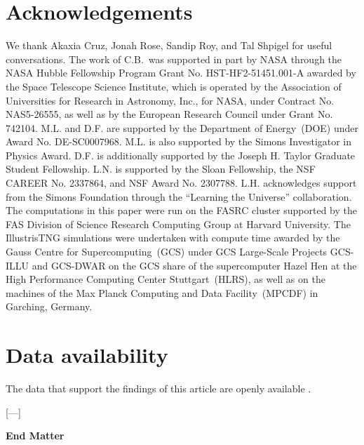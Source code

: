 \documentclass[aps,prl,reprint,superscriptaddress,nopreprintnumbers,nobibnotes,floatfix,longbibliography,footinbib]{revtex4-2}
\let\oldtheequation\theequation
\renewcommand\theequation{(\oldtheequation)}
\newcommand{\Illustris}{Illustris}
\newcommand{\TNG}{TNG}
\begin{document}
\section{Acknowledgements}
We thank Akaxia Cruz, Jonah Rose, Sandip Roy, and Tal Shpigel for useful conversations. The work of C.B.~was supported in part by NASA through the NASA Hubble Fellowship Program Grant No. HST-HF2-51451.001-A awarded by the Space Telescope Science Institute, which is operated by the Association of Universities for Research in Astronomy, Inc., for NASA, under Contract No. NAS5-26555, as well as by the European Research Council under Grant No. 742104. M.L. and D.F. are supported by the Department of Energy~(DOE) under Award No. DE-SC0007968. M.L. is also supported by the Simons Investigator in Physics Award. D.F. is additionally supported by the Joseph H. Taylor Graduate Student Fellowship. L.N. is supported by the Sloan Fellowship, the NSF CAREER No. 2337864, and NSF Award No. 2307788. L.H. acknowledges support from the Simons Foundation through the ``Learning the Universe'' collaboration. The computations in this paper were run on the FASRC cluster supported by the FAS Division of Science Research Computing Group at Harvard University. The \Illustris\TNG{} simulations were undertaken with compute time awarded by the Gauss Centre for Supercomputing~(GCS) under GCS Large-Scale Projects GCS-ILLU and GCS-DWAR on the GCS share of the supercomputer Hazel Hen at the High Performance Computing Center Stuttgart~(HLRS), as well as on the machines of the Max Planck Computing and Data Facility~(MPCDF) in Garching, Germany.


\vspace{\baselineskip}
\section{Data availability}
The data that support the findings of this article are openly available \cite{data_release}.



[---]
\setcounter{section}{0}

\onecolumngrid
\begin{center}
\large\textbf{End Matter}
\end{center}
\renewcommand{\theequation}{(\Alph{section}\arabic{equation})}
\twocolumngrid
\end{document}
